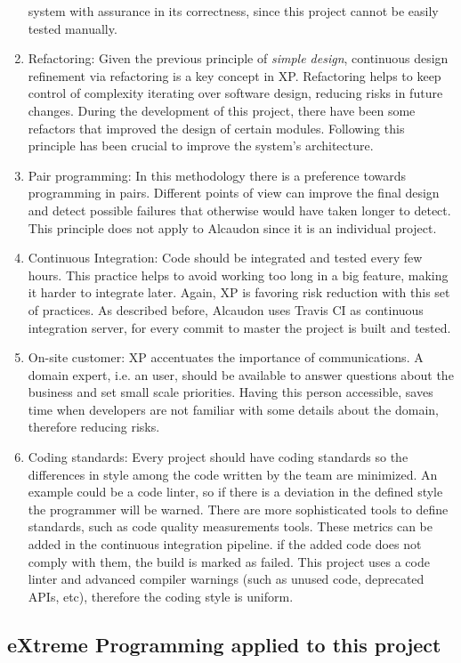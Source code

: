 \begin{enumerate}
  system with assurance in its correctness, since this project cannot be
  easily tested manually.
\item Refactoring: Given the previous principle of \textit{simple design},
  continuous design refinement via refactoring is a key concept in \acs{XP}.
  Refactoring helps to keep control of complexity iterating over software
  design, reducing risks in future changes. During the development of this
  project, there have been some refactors that improved the design of certain
  modules. Following this principle has been crucial to improve the system's
  architecture.
\item Pair programming: In this methodology there is a preference towards programming
  in pairs. Different points of view can improve the final design and detect
  possible failures that otherwise would have taken longer to detect. This
  principle does not apply to Alcaudon since it is an individual project.
\item Continuous Integration: Code should be integrated and tested every few
  hours. This practice helps to avoid working too long in a big feature, making
  it harder to integrate later. Again, \acs{XP} is favoring risk reduction with this
  set of practices. As described before, Alcaudon uses Travis CI as continuous
  integration server, for every commit to master the project is built and
  tested.
\item On-site customer: \acs{XP} accentuates the importance of communications. A
  domain expert, i.e. an user, should be available to answer questions about the
  business and set small scale priorities. Having this person accessible, saves
  time when developers are not familiar with some details about the domain, therefore
  reducing risks.
\item Coding standards: Every project should have coding standards so the
  differences in style among the code written by the team are minimized. An
  example could be a code linter, so if there is a deviation in the defined
  style the programmer will be warned. There are more sophisticated tools to
  define standards, such as code quality measurements tools. These metrics can
  be added in the continuous integration pipeline. if the added code does not
  comply with them, the build is marked as failed. This project uses a code
  linter and advanced compiler warnings (such as unused code, deprecated APIs,
  etc), therefore the coding style is uniform.
\end{enumerate}

\subsection{eXtreme Programming applied to this project}

